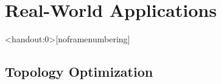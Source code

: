 \section{Real-World Applications}



\begin{frame}<handout:0>[noframenumbering]
  \begin{overlay}
    \sectionCircle
  \end{overlay}
\end{frame}



\subsection{Topology Optimization}

